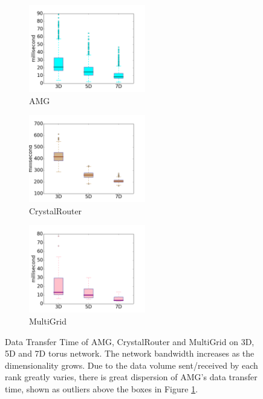 \documentclass[conference]{IEEEtran}
\begin{document}
\begin{figure}[t!]
    \centering
    \begin{subfigure}[t]{0.32\textwidth}
        \centering
        \includegraphics[height=1.5in]{figs/dimenstudy/amg_box}
        \caption{AMG}
        \label{fig:dimen-amg}
    \end{subfigure}%
    \hspace{1em}%
    \begin{subfigure}[t]{0.32\textwidth}
        \centering
        \includegraphics[height=1.5in]{figs/dimenstudy/cr_box}
        \caption{CrystalRouter}
        \label{fig:dimen-cr}
    \end{subfigure}%
    \begin{subfigure}[t]{0.32\textwidth}
        \centering
        \includegraphics[height=1.5in]{figs/dimenstudy/mg_box}
        \caption{MultiGrid}
        \label{fig:dimen-mg}
    \end{subfigure}%
   \caption{Data Transfer Time of AMG, CrystalRouter and MultiGrid on 3D, 5D and 7D torus network. The network bandwidth increases as the dimensionality grows. Due to the data volume sent/received by each rank greatly varies, there is great dispersion of AMG's data transfer time, shown as outliers above the boxes in Figure \ref{fig:dimen-amg}.}
   \label{fig:dimensionality-study}
\end{figure}
\end{document}
